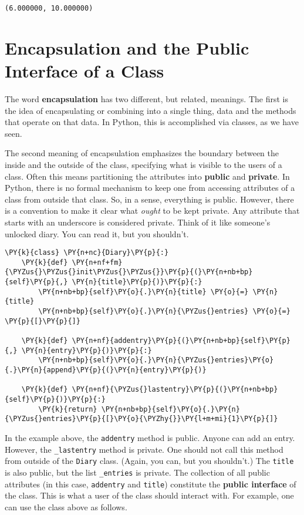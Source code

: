 \begin{Verbatim}
(6.000000, 10.000000)
\end{Verbatim}

\section{Encapsulation and the Public Interface of a Class}


The word \textbf{encapsulation} has two different, but related, meanings.  The first is the idea of encapsulating or combining into a single thing, data and the methods that operate on that data.  In Python, this is accomplished via classes, as we have seen.  


The second meaning of encapsulation emphasizes the boundary between the inside and the outside of the class, specifying what is visible to the users of a class.  Often this means partitioning the attributes into \textbf{public} and \textbf{private}.  In Python, there is no formal mechanism to keep one from accessing attributes of a class from outside that class.  So, in a sense, everything is public.  However, there is a convention to make it clear what \emph{ought} to be kept private.  Any attribute that starts with an underscore is considered private.  Think of it like someone’s unlocked diary.  You can read it, but you shouldn’t.

\begin{Verbatim}[commandchars=\\\{\}]
\PY{k}{class} \PY{n+nc}{Diary}\PY{p}{:}
    \PY{k}{def} \PY{n+nf+fm}{\PYZus{}\PYZus{}init\PYZus{}\PYZus{}}\PY{p}{(}\PY{n+nb+bp}{self}\PY{p}{,} \PY{n}{title}\PY{p}{)}\PY{p}{:}
        \PY{n+nb+bp}{self}\PY{o}{.}\PY{n}{title} \PY{o}{=} \PY{n}{title}
        \PY{n+nb+bp}{self}\PY{o}{.}\PY{n}{\PYZus{}entries} \PY{o}{=} \PY{p}{[}\PY{p}{]}

    \PY{k}{def} \PY{n+nf}{addentry}\PY{p}{(}\PY{n+nb+bp}{self}\PY{p}{,} \PY{n}{entry}\PY{p}{)}\PY{p}{:}
        \PY{n+nb+bp}{self}\PY{o}{.}\PY{n}{\PYZus{}entries}\PY{o}{.}\PY{n}{append}\PY{p}{(}\PY{n}{entry}\PY{p}{)}

    \PY{k}{def} \PY{n+nf}{\PYZus{}lastentry}\PY{p}{(}\PY{n+nb+bp}{self}\PY{p}{)}\PY{p}{:}
        \PY{k}{return} \PY{n+nb+bp}{self}\PY{o}{.}\PY{n}{\PYZus{}entries}\PY{p}{[}\PY{o}{\PYZhy{}}\PY{l+m+mi}{1}\PY{p}{]}
\end{Verbatim}



In the example above, the \texttt{addentry} method is public.  Anyone can add an entry.  However, the \texttt{\_lastentry} method is private.  One should not call this method from outside of the \texttt{Diary} class. (Again, you can, but you shouldn’t.)  The \texttt{title} is also public, but the list \texttt{\_entries} is private.  The collection of all public attributes (in this case, \texttt{addentry} and \texttt{title}) constitute the \textbf{public interface} of the class.  This is what a user of the class should interact with.  For example, one can use the class above as follows.


